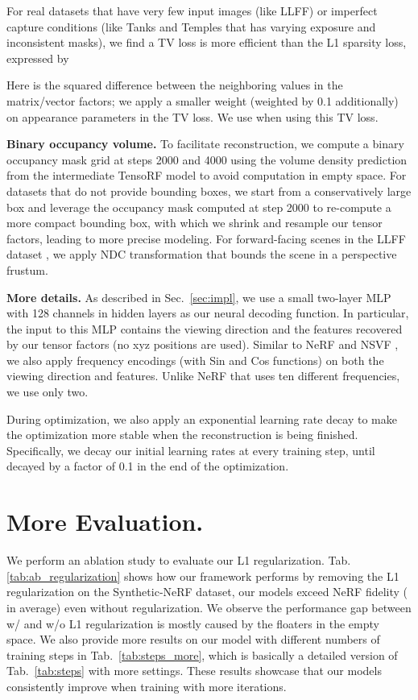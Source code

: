 \documentclass[runningheads]{llncs}
\newcommand{\boldstart}[1]{\noindent\textbf{#1}}
\begin{document}
For real datasets that have very few input images (like LLFF\cite{llff}) or imperfect capture conditions (like Tanks and Temples \cite{Knapitsch2017} that has varying exposure and inconsistent masks), we find a TV loss is more efficient
than the L1 sparsity loss, expressed by



Here  is the squared difference between the neighboring values in the matrix/vector factors; we apply a smaller weight (weighted by 0.1 additionally) on appearance parameters in the TV loss.
We use  when using this TV loss.

\boldstart{Binary occupancy volume.}
To facilitate reconstruction, we compute a binary occupancy mask grid at steps 2000 and 4000 using the volume density prediction from the intermediate TensoRF model to avoid computation in empty space.
For datasets that do not provide bounding boxes, we start from a conservatively large box and leverage the occupancy mask computed at step 2000 to re-compute a more compact bounding box, with which we shrink and resample our tensor factors, leading to more precise modeling. For forward-facing scenes in the LLFF dataset \cite{llff}, we apply NDC transformation that bounds the scene in a perspective frustum.
 

\boldstart{More details.}
As described in Sec.~\ref{sec:impl}, we use a small two-layer MLP with 128 channels in hidden layers as our neural decoding function.
In particular, the input to this MLP contains the viewing direction and the features recovered by our tensor factors (no xyz positions are used). Similar to NeRF and NSVF \cite{mildenhall2020nerf,liu2020neural}, we also apply frequency encodings (with Sin and Cos functions) on both the viewing direction and features. Unlike NeRF that uses ten different frequencies, we use only two.


During optimization, we also apply an exponential learning rate decay to make the optimization more stable when the reconstruction is being finished. Specifically, we decay our initial learning rates at every training step, until decayed by a factor of 0.1 in the end of the optimization. 




\section{More Evaluation.}
We perform an ablation study to evaluate our L1 regularization.
Tab. \ref{tab:ab_regularization} shows how our framework performs by removing the L1 regularization on the Synthetic-NeRF dataset, our models exceed NeRF fidelity ( in average) even without regularization. 
We observe the performance gap between w/ and w/o L1 regularization is mostly caused by the floaters in the empty space.
We also provide more results on our model with different numbers of training steps in Tab.~\ref{tab:steps_more}, which is basically a detailed version of Tab.~\ref{tab:steps} with more settings.
These results showcase that our models consistently improve when training with more iterations.
\end{document}
